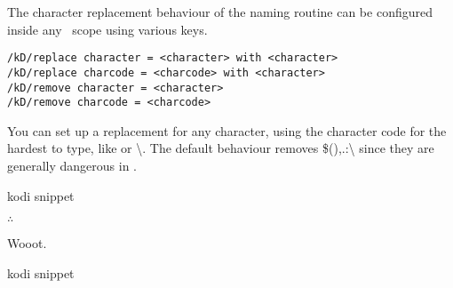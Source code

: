 The character replacement behaviour of the naming routine can be configured
inside any \koDi\ scope using various keys.

\begin{lstlisting}
/kD/replace character = <character> with <character>
/kD/replace charcode = <charcode> with <character>
/kD/remove character = <character>
/kD/remove charcode = <charcode>
\end{lstlisting}




You can set up a replacement for any character, using the character code for
the hardest to type, like {\ttfamily \textvisiblespace} or {\ttfamily \textbackslash}.
The default behaviour removes {\ttfamily \$(),.:\textbackslash} since they
are generally dangerous in \TikZ.

\begin{tcblisting}{kodi snippet}
\end{tcblisting}

\hfill$\therefore$\hfill\null

Wooot.

\begin{tcblisting}{kodi snippet}
\end{tcblisting}


